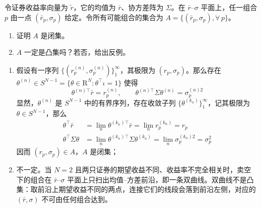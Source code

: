 \begin{problem}
 令证券收益率向量为 $\tilde{r}$，它的均值为 $\bar{r}$、协方差阵为 $\Sigma$。在 $\bar{r}$--$\sigma$ 平面上，任一组合 $p$ 由一点 $(\bar{r}_{p},\sigma_{p})$ 给定。令所有可能组合的集合为 $A=\{(\bar{r}_{p},\sigma_{p}),\forall\, p\}$。
\begin{enumerate}[label=(\alph*)]
    \item 证明 $A$ 是闭集。
    \item $A$ 一定是凸集吗？若否，给出反例。
\end{enumerate}
\end{problem}
\begin{solution}
\begin{enumerate}[label=(\alph*)]
    \item 假设有一序列 $\bigl\{(r_{p}^{(n)},\sigma_{p}^{(n)})\bigr\}_{1}^{\infty}$，其极限为 $(r_{p},\sigma_{p})$。那么存在 $\theta^{(n)}\in S^{N-1}=\{\theta\in\mathrm{R}^{N}:\theta^{\top}\iota=1\}$ 使得
    \[
        \theta^{(n)\top}\bar{r}=r_{p}^{(n)},\qquad\theta^{(n)\top}\Sigma\theta^{(n)}=\sigma_{p}^{(n)2}
    \]
    显然，$\theta^{(n)}$ 是 $S^{N-1}$ 中的有界序列，存在收敛子列 $\{\theta^{(k_{n})}\}_{1}^{\infty}$，记其极限为 $\theta\in S^{N-1}$，那么
    \[
        \begin{aligned}
            \theta^{\top}\bar{r}&=\lim_{n}\theta^{(k_{n})\top}\bar{r}=\lim_{n}r_{p}^{(k_{n})}=r_{p}\\
            \theta^{\top}\Sigma\theta&=\lim_{n}\theta^{(k_{n})\top}\Sigma\theta^{(k_{n})}=\lim_{n}\sigma_{p}^{(k_{n})2}=\sigma_{p}^{2}
        \end{aligned}
    \]
    因而 $(r_{p},\sigma_{p})\in A$，$A$ 是闭集；
    \item 不一定。当 $N=2$ 且两只证券的期望收益不同、收益率不完全相关时，卖空下的组合在 $\bar{r}$--$\sigma$ 平面上只扫出均值--方差前沿，即一条双曲线。双曲线不是凸集：取前沿上期望收益不同的两点，连接它们的线段会落到前沿左侧，对应的 $(\bar{r},\sigma)$ 不可由任何组合达到。
\end{enumerate}
\end{solution}

